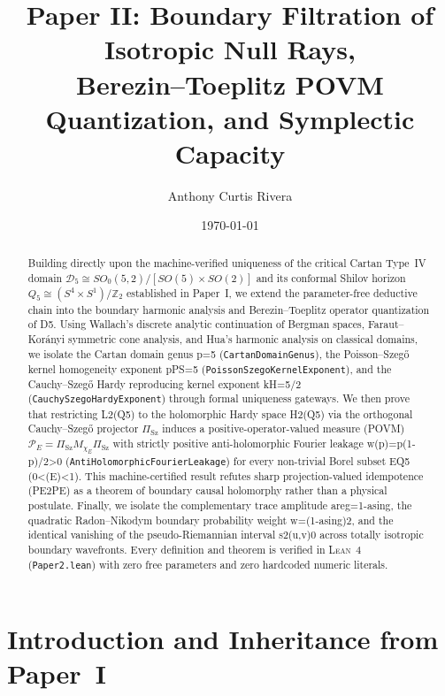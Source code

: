\documentclass[11pt,reqno]{amsart}
\title[Boundary Filtration, Berezin--Toeplitz POVM Quantization, and Symplectic Capacity]{%
  Paper II: Boundary Filtration of Isotropic Null Rays,\\
  Berezin--Toeplitz POVM Quantization, and Symplectic Capacity%
}
\author{Anthony Curtis Rivera}
\date{\today}
\theoremstyle{definition}
\theoremstyle{remark}
\newcommand{\PiSz}{\Pi_{\mathrm{Sz}}}
\begin{document}
\begin{abstract}
Building directly upon the machine-verified uniqueness of the critical Cartan Type~IV domain $\mathcal{D}_5 \cong SO_0(5,2)/[SO(5)\times SO(2)]$ and its conformal Shilov horizon $Q_5 \cong (S^4 \times S^1)/\mathbb{Z}_2$ established in Paper~I, we extend the parameter-free deductive chain into the boundary harmonic analysis and Berezin--Toeplitz operator quantization of D5. Using Wallach's discrete analytic continuation of Bergman spaces, Faraut--Kor\'anyi symmetric cone analysis, and Hua's harmonic analysis on classical domains, we isolate the Cartan domain genus p=5 (\texttt{CartanDomainGenus}), the Poisson--Szeg\H{o} kernel homogeneity exponent pPS=5 (\texttt{PoissonSzegoKernelExponent}), and the Cauchy--Szeg\H{o} Hardy reproducing kernel exponent kH=5/2 (\texttt{CauchySzegoHardyExponent}) through formal uniqueness gateways. We then prove that restricting L2(Q5) to the holomorphic Hardy space H2(Q5) via the orthogonal Cauchy--Szeg\H{o} projector $\PiSz$ induces a positive-operator-valued measure (POVM) $\mathcal{P}_E = \PiSz M_{\chi_E} \PiSz$ with strictly positive anti-holomorphic Fourier leakage w(p)=p(1-p)/2>0 (\texttt{AntiHolomorphicFourierLeakage}) for every non-trivial Borel subset EQ5 (0<(E)<1). This machine-certified result refutes sharp projection-valued idempotence (PE2PE) as a theorem of boundary causal holomorphy rather than a physical postulate. Finally, we isolate the complementary trace amplitude areg=1-asing, the quadratic Radon--Nikodym boundary probability weight w=(1-asing)2, and the identical vanishing of the pseudo-Riemannian interval s2(u,v)0 across totally isotropic boundary wavefronts. Every definition and theorem is verified in \textsc{Lean~4} (\texttt{Paper2.lean}) with zero free parameters and zero hardcoded numeric literals.
\end{abstract}

\maketitle
\tableofcontents

\section{Introduction and Inheritance from Paper~I}
\end{document}
